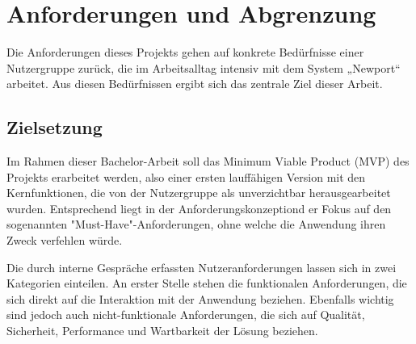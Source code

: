 \section{Anforderungen und Abgrenzung}
Die Anforderungen dieses Projekts gehen auf konkrete Bedürfnisse einer Nutzergruppe zurück, 
die im Arbeitsalltag intensiv mit dem System „Newport“ arbeitet. Aus diesen Bedürfnissen ergibt sich das zentrale Ziel dieser Arbeit.

\subsection{Zielsetzung}
Im Rahmen dieser Bachelor-Arbeit soll das Minimum Viable Product (MVP) des Projekts erarbeitet werden, also 
einer ersten lauffähigen Version mit den Kernfunktionen, die von der Nutzergruppe als unverzichtbar herausgearbeitet 
wurden. Entsprechend liegt in der Anforderungskonzeptiond er Fokus auf den sogenannten "Must-Have"-Anforderungen,
ohne welche die Anwendung ihren Zweck verfehlen würde. 

Die durch interne Gespräche erfassten Nutzeranforderungen lassen sich in zwei Kategorien einteilen. An erster Stelle stehen
die funktionalen Anforderungen, die sich direkt auf die Interaktion mit der Anwendung beziehen. Ebenfalls wichtig sind jedoch auch
nicht-funktionale Anforderungen, die sich auf Qualität, Sicherheit, Performance und Wartbarkeit der Lösung beziehen.
